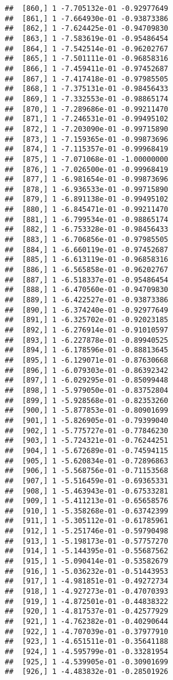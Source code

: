 \documentclass[
  12pt,
]{article}
\begin{document}
\begin{verbatim}
##  [860,] 1 -7.705132e-01 -0.92977649
##  [861,] 1 -7.664930e-01 -0.93873386
##  [862,] 1 -7.624425e-01 -0.94709830
##  [863,] 1 -7.583619e-01 -0.95486454
##  [864,] 1 -7.542514e-01 -0.96202767
##  [865,] 1 -7.501111e-01 -0.96858316
##  [866,] 1 -7.459411e-01 -0.97452687
##  [867,] 1 -7.417418e-01 -0.97985505
##  [868,] 1 -7.375131e-01 -0.98456433
##  [869,] 1 -7.332553e-01 -0.98865174
##  [870,] 1 -7.289686e-01 -0.99211470
##  [871,] 1 -7.246531e-01 -0.99495102
##  [872,] 1 -7.203090e-01 -0.99715890
##  [873,] 1 -7.159365e-01 -0.99873696
##  [874,] 1 -7.115357e-01 -0.99968419
##  [875,] 1 -7.071068e-01 -1.00000000
##  [876,] 1 -7.026500e-01 -0.99968419
##  [877,] 1 -6.981654e-01 -0.99873696
##  [878,] 1 -6.936533e-01 -0.99715890
##  [879,] 1 -6.891138e-01 -0.99495102
##  [880,] 1 -6.845471e-01 -0.99211470
##  [881,] 1 -6.799534e-01 -0.98865174
##  [882,] 1 -6.753328e-01 -0.98456433
##  [883,] 1 -6.706856e-01 -0.97985505
##  [884,] 1 -6.660119e-01 -0.97452687
##  [885,] 1 -6.613119e-01 -0.96858316
##  [886,] 1 -6.565858e-01 -0.96202767
##  [887,] 1 -6.518337e-01 -0.95486454
##  [888,] 1 -6.470560e-01 -0.94709830
##  [889,] 1 -6.422527e-01 -0.93873386
##  [890,] 1 -6.374240e-01 -0.92977649
##  [891,] 1 -6.325702e-01 -0.92023185
##  [892,] 1 -6.276914e-01 -0.91010597
##  [893,] 1 -6.227878e-01 -0.89940525
##  [894,] 1 -6.178596e-01 -0.88813645
##  [895,] 1 -6.129071e-01 -0.87630668
##  [896,] 1 -6.079303e-01 -0.86392342
##  [897,] 1 -6.029295e-01 -0.85099448
##  [898,] 1 -5.979050e-01 -0.83752804
##  [899,] 1 -5.928568e-01 -0.82353260
##  [900,] 1 -5.877853e-01 -0.80901699
##  [901,] 1 -5.826905e-01 -0.79399040
##  [902,] 1 -5.775727e-01 -0.77846230
##  [903,] 1 -5.724321e-01 -0.76244251
##  [904,] 1 -5.672689e-01 -0.74594115
##  [905,] 1 -5.620834e-01 -0.72896863
##  [906,] 1 -5.568756e-01 -0.71153568
##  [907,] 1 -5.516459e-01 -0.69365331
##  [908,] 1 -5.463943e-01 -0.67533281
##  [909,] 1 -5.411213e-01 -0.65658576
##  [910,] 1 -5.358268e-01 -0.63742399
##  [911,] 1 -5.305112e-01 -0.61785961
##  [912,] 1 -5.251746e-01 -0.59790498
##  [913,] 1 -5.198173e-01 -0.57757270
##  [914,] 1 -5.144395e-01 -0.55687562
##  [915,] 1 -5.090414e-01 -0.53582679
##  [916,] 1 -5.036232e-01 -0.51443953
##  [917,] 1 -4.981851e-01 -0.49272734
##  [918,] 1 -4.927273e-01 -0.47070393
##  [919,] 1 -4.872501e-01 -0.44838322
##  [920,] 1 -4.817537e-01 -0.42577929
##  [921,] 1 -4.762382e-01 -0.40290644
##  [922,] 1 -4.707039e-01 -0.37977910
##  [923,] 1 -4.651511e-01 -0.35641188
##  [924,] 1 -4.595799e-01 -0.33281954
##  [925,] 1 -4.539905e-01 -0.30901699
##  [926,] 1 -4.483832e-01 -0.28501926

\end{verbatim}
\end{document}
